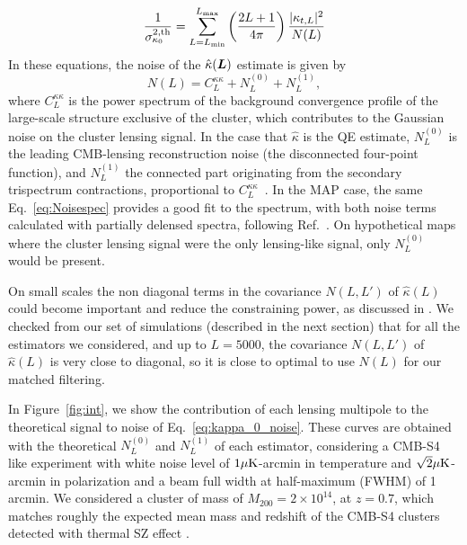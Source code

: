 \documentclass[prd, superscriptaddress, tightenlines, longbibliography, nofootinbib, eqsecnum, amsfonts, amsmath, floatfix, twocolumn, notitlepage]{revtex4-2}
\newcommand{\JC}[1]{\color{purple}{{JC:#1}}\color{black}\xspace}
\begin{document}
\begin{equation}
\frac{1}{\sigma^{2,\text{th}}_{\kappa_0}}=	\sum_{L=L_{\rm min}}^{L_{\rm max}} \left( \frac{2L + 1}{4\pi} \right)\frac{|\kappa_{t,L}|^2}{N(L)}
\end{equation}
In these equations, the noise of the $\hat \kappa(\vL)$ estimate is given by \begin{equation}\label{eq:Noisespec}
 	N(L) = C_L^{\kappa\kappa} + N_L^{(0)} + N_L^{(1)},
 \end{equation}
where $C_L^{\kappa\kappa}$ is the power spectrum of the background convergence profile of the large-scale structure exclusive of the cluster, which contributes to the Gaussian noise on the cluster lensing signal. In the case that $\hat \kappa$ is the QE estimate, $N^{(0)}_L$ is the leading CMB-lensing reconstruction noise (the disconnected four-point function), and $N^{(1)}_L$ the connected part originating from the secondary trispectrum contractions, proportional to $C_L^{\kappa\kappa}$~\cite{Kesden:2003cc,Lewis:2006fu}. In the MAP case, the same Eq.~\eqref{eq:Noisespec} provides a good fit to the spectrum, with both noise terms calculated with partially delensed spectra, following Ref.~\cite{Legrand:2021qdu}. On hypothetical maps where the cluster lensing signal were the only lensing-like signal, only $N^{(0)}_L$ would be present.

On small scales the non diagonal terms in the covariance  $N(L, L')$ of $\hat \kappa(L)$ could become important and reduce the constraining power, as discussed in \cite{Horowitz:2017iql}.
 We checked from our set of simulations (described in the next section) that for all the estimators we considered, and up to $L=5000$, the covariance $N(L, L')$ of $\hat \kappa(L)$ is very close to diagonal, so it is close to optimal to use $N(L)$ for our matched filtering.

In Figure~\ref{fig:int}, we show the contribution of each lensing multipole to the theoretical signal to noise of Eq.~\ref{eq:kappa_0_noise}. These curves are obtained with the theoretical $N_L^{(0)}$ and $N_L^{(1)}$ of each estimator, considering a  CMB-S4 like experiment with white noise level of $1 \mu \rm{K}$-arcmin in temperature and $\sqrt{2} \mu \rm{K}$-arcmin in polarization and a beam full width at half-maximum (FWHM) of 1 arcmin.
We considered a cluster of mass of $M_{200} = 2\times 10^{14}$, at $z=0.7$, which matches roughly the expected mean mass and redshift of the CMB-S4 clusters detected with thermal SZ effect \cite{CMB-S4:2016ple}. 
\end{document}
